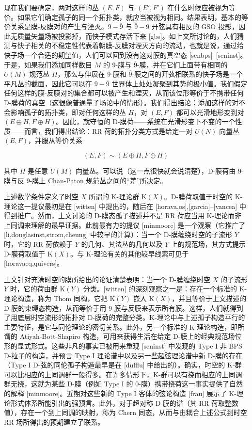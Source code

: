 \documentclass[11pt,a4paper]{ctexart}
\begin{document}
现在我们要确定，两对这样的丛 \((E,F)\) 与 \((E',F')\) 在什么时候应被视为等价。如果它们确定孤子的同一个拓扑类，就应当被视为相同。结果表明，基本的等价关系是膜-反膜对的产生与湮灭。\(9-\overline{9}\) 与 \(\overline{9}-9\) 开弦具有相反的 GSO 投影，因此无质量矢量场被投影掉，而快子模式存活下来 [gbs]。如上文所讨论的，人们猜测与快子相关的不稳定性代表着朝膜-反膜对湮灭方向的流动，也就是说，通过给快子场一个合适的期望值，人们可以回到没有这对膜的真空态 [senbps]--[seninst]。于是，如果我们添加同样数目 \(M\) 的 9-膜与 \(\overline{9}\)-膜，并在它们上面带有相同的 \(U(M)\) 规范丛 \(H\)，那么与伸展在 9-膜和 \(\overline{9}\)-膜之间的开弦相联系的快子场是一个平凡丛的截面，因此它可以在 \(9-\overline{9}\) 世界体上处处凝聚到其势的极小值。我们假定任何这样的膜-反膜对的集合都可以被产生和湮灭，从而该位形等价于不携带任何 D-膜荷的真空（这很像普通量子场论中的情形）。我们得出结论：添加这样的对不会影响孤子的拓扑类，即对任何这样的丛 \(H\)，对 \((E,F)\) 都可以光滑地形变到对 \((E\oplus H,F\oplus H)\)。因此，就守恒的 D-膜荷------系统在光滑形变下不变的一个性质------而言，我们得出结论：RR 荷的拓扑分类方式是给定一对 \(U(N)\) 向量丛 \((E,F)\)，并服从等价关系

\[(E,F)\sim(E\oplus H,F\oplus H)\]

其中 \(H\) 是任意 \(U(M)\) 向量丛。可以说（这一点很快就会说清楚），D-膜荷由 9-膜与反 9-膜上 Chan-Paton 规范丛之间的``差''所决定。

上述数学条件定义了时空 \(X\) 所谓的 K-理论群 \({\mathrm K}(X)\)。D-膜荷取值于时空的 K-理论这一提议最初是在 [witten] 中提出的，随后在 [horava,os],[garcia]--[vancea] 中得到推广。然而，上文讨论的 D-膜态孤子描述并不是 RR 荷应当用 K-理论而非上同调来理解的最早证据。此前最有力的提议 [minmoore] 是一个观察（它推广了 [li,douglasinst,strom,cheung] 中较早的计算）：当一个 D-膜缠绕时空的子流形 \(Y\) 时，它的 RR 荷依赖于 \(Y\) 的几何、其法丛的几何以及 \(Y\) 上的规范场，其方式提示 D-膜荷取值于 \({\mathrm K}(X)\)。与 K-理论有关的其他较早线索可见于 [horavaeq,quivers]。

上文针对充满时空的膜所给出的论证清楚表明：当一个 D-膜缠绕时空 \(X\) 的子流形 \(Y\) 时，它的荷由群 \({\mathrm K}(Y)\) 分类。[witten] 的深刻观察之一是：存在一个标准的 K-理论构造，称为 Thom 同构，它把 \({\mathrm K}(Y)\) 嵌入 \({\mathrm K}(X)\)，并且等价于上文描述的 D-膜的束缚态构造，从而等价于用 9-膜与反膜来表示所有膜。这样，人们就得到了用底层时空流形的拓扑对 D-膜荷的完整分类。K-理论中与上述孤子构造平行的主要特征，是它与同伦理论的密切关系。此外，另一个标准的 K-理论构造，即所谓的 Atiyah-Bott-Shapiro 构造，可用来获得生活在给定 D-膜上的经典规范场位形的显式形式。这些非凡的事实已被用来重现 [seninst] 中发现的 Type I 非 BPS D-粒子的构造，并预言 Type I 理论谱中以及另一些超弦理论谱中新 D-膜的存在（Type I D-弦的同伦孤子构造最早是在 [dufflu] 中给出的）。确实，时空的 K-群可以比相应的上同调群一般得多。在许多情形下，K-群可以有挠而相应的上同调群无挠，这就为某些 D-膜（例如 Type I 的 0-膜）携带挠荷这一事实提供了自然的解释 [minmoore]。近期对这些新的 Type I 客体的弦论构造 [frau] 展示了 K-理论形式体系所能引出的强预言。此外，对于超对称 D-膜的谱（其 RR 荷取整数值），存在一个到上同调的映射，称为 Chern 同态，从而与由耦合上述公式到时空 RR 场所得出的预期建立了联系。
\end{document}
